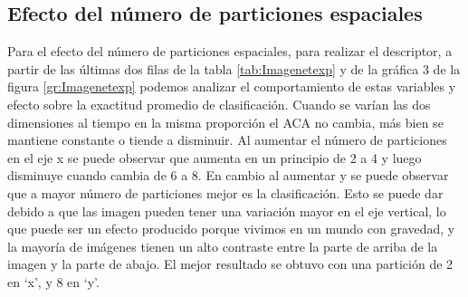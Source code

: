 \documentclass[10pt,twocolumn,letterpaper]{article}
\begin{document}

\subsection{Efecto del número de particiones espaciales}
Para el efecto del número de particiones espaciales, para realizar el descriptor, a partir de las últimas dos filas de la tabla \ref{tab:Imagenetexp} y de la gráfica 3 de la figura \ref{gr:Imagenetexp} podemos analizar el comportamiento de estas variables y efecto sobre la exactitud promedio de clasificación. Cuando se varían las dos dimensiones al tiempo en la misma proporción el ACA no cambia, más bien se mantiene constante o tiende a disminuir. Al aumentar el número de particiones en el eje x se puede observar que aumenta en un principio de 2 a 4 y luego disminuye cuando cambia de 6 a 8. En cambio al aumentar y se puede observar que a mayor número de particiones mejor es la clasificación. Esto se puede dar debido a que las imagen pueden tener una variación mayor en el eje vertical, lo que puede ser un efecto producido porque vivimos en un mundo con gravedad, y la mayoría de imágenes tienen un alto contraste entre la parte de arriba de la imagen y la parte de abajo. El mejor resultado se obtuvo con una partición de 2 en ‘x’, y 8 en ‘y’.

\end{document}
